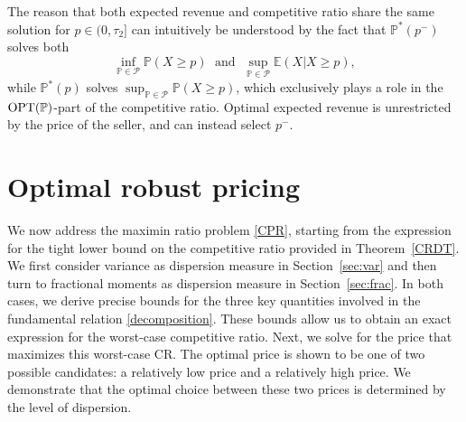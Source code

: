 \documentclass[11pt]{article}
\newcommand{\bP}{\mathbb{P}}
\newcommand{\cP}{\mathcal{P}}
\newcommand{\bE}{\mathbb{E}}
\newcommand{\1}{\mathds{1}}
\begin{document}
The reason that both expected revenue and competitive ratio share the same solution for $p\in (0,\tau_2]$ can intuitively be understood by the fact that $\bP^*(p^-)$ solves both $$\inf_{\bP\in\cP}\bP(X\geq p) \; \text{ and } \; \sup_{\bP\in \cP}\bE(X|X \geq p),$$ while $\bP^*(p)$ solves $\sup_{\bP\in\cP}\bP(X\geq p)$, which exclusively plays a role in the $\textup{OPT}(\bP)$-part of the competitive ratio. Optimal expected revenue is unrestricted by the price of the seller, and can instead select $p^-$.

\section{Optimal robust pricing}\label{sec:rprice}
We now address the maximin ratio problem \eqref{CPR}, starting from the expression for the tight lower bound on the competitive ratio provided in Theorem~\ref{CRDT}. 
We first consider variance as dispersion measure in Section~\ref{sec:var} and then turn to fractional moments as dispersion measure in Section~\ref{sec:frac}. In both cases, we derive precise bounds for the three key quantities involved in the fundamental relation \eqref{decomposition}. These bounds allow us to obtain an exact expression for the worst-case competitive ratio. Next, we solve for the price that maximizes this worst-case CR. The optimal price is shown to be one of two possible candidates: a relatively low price and a relatively high price. We demonstrate that the optimal choice between these two prices is determined by the level of dispersion.
\end{document}
